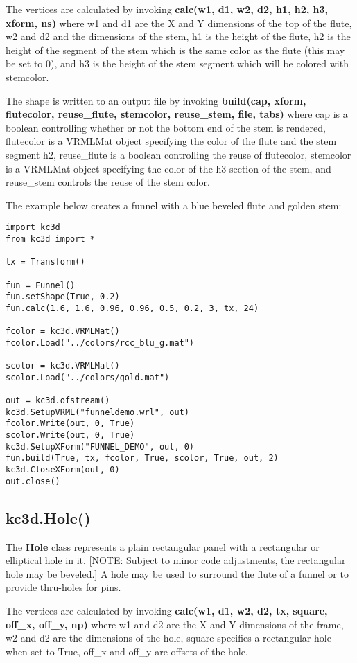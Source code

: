 \documentclass[a4paper, dvipdfm]{article}
\begin{document}
The vertices are calculated by invoking \textbf{calc(w1, d1, w2, d2, h1, h2, h3, xform, ns)}
where w1 and d1 are the X and Y dimensions of the top of the flute, w2 and d2 and the
dimensions of the stem, h1 is the height of the flute, h2 is the height of the segment of
the stem which is the same color as the flute (this may be set to 0), and h3 is the
height of the stem segment which will be colored with stemcolor.

The shape is written to an output file by invoking \textbf{build(cap, xform, flutecolor,
reuse\_flute, stemcolor, reuse\_stem, file, tabs)} where cap is a boolean controlling
whether or not the bottom end of the stem is rendered, flutecolor is a VRMLMat object
specifying the color of the flute and the stem segment h2, reuse\_flute is a boolean
controlling the reuse of flutecolor, stemcolor is a VRMLMat object specifying the color
of the h3 section of the stem, and reuse\_stem controls the reuse of the stem color.

The example below creates a funnel with a blue beveled flute and golden stem:

\begin{verbatim}
import kc3d
from kc3d import *

tx = Transform()

fun = Funnel()
fun.setShape(True, 0.2)
fun.calc(1.6, 1.6, 0.96, 0.96, 0.5, 0.2, 3, tx, 24)

fcolor = kc3d.VRMLMat()
fcolor.Load("../colors/rcc_blu_g.mat")

scolor = kc3d.VRMLMat()
scolor.Load("../colors/gold.mat")

out = kc3d.ofstream()
kc3d.SetupVRML("funneldemo.wrl", out)
fcolor.Write(out, 0, True)
scolor.Write(out, 0, True)
kc3d.SetupXForm("FUNNEL_DEMO", out, 0)
fun.build(True, tx, fcolor, True, scolor, True, out, 2)
kc3d.CloseXForm(out, 0)
out.close()
\end{verbatim}

\subsection{kc3d.Hole()}
The \textbf{Hole} class represents a plain rectangular panel with a rectangular or elliptical
hole in it. [NOTE: Subject to minor code adjustments, the rectangular hole may be beveled.]
A hole may be used to surround the flute of a funnel or to provide thru-holes for pins.

The vertices are calculated by invoking \textbf{calc(w1, d1, w2, d2, tx, square, off\_x, off\_y, np)}
where w1 and d2 are the X and Y dimensions of the frame, w2 and d2 are the dimensions of the
hole, square specifies a rectangular hole when set to True, off\_x and off\_y are offsets of
the hole.
\end{document}
